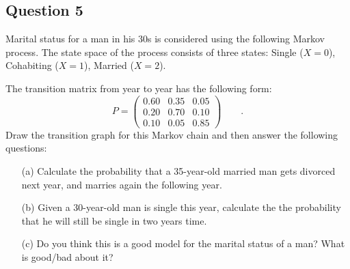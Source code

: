 \documentclass[a4paper]{article}
\begin{document}
\subsection{Question 5}



Marital status for a man in his 30s is considered using the following  Markov
process. The state space of the process consists of three states: Single  ($X=0$), Cohabiting
 ($X=1$), Married  ($X=2$).

The transition matrix  from  year to year has the following form:
$$
P=
\left(
\begin{matrix}
 0.60  &   0.35  &  0.05  \\
 0.20  &   0.70  &  0.10  \\
 0.10  &    0.05 &  0.85
\end{matrix}
\right) \qquad .
$$
Draw the transition graph for this Markov chain and then answer the following questions:

\begin{itemize}
\item[(a)] Calculate the probability that a 35-year-old married man gets divorced next year, and marries again the following year.
\item[(b)] Given a 30-year-old  man is single   this year, calculate the the probability that he will still  be single in two years time.
\item[(c)] Do you think this is a good model for the marital status of a man?  What is good/bad about it? 
\end{itemize}
\end{document}

